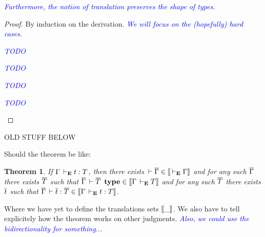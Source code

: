 \documentclass{amsart}
\newcommand\meta[1]{\noindent\textcolor{blue}{\emph{#1}}}
\newtheorem{theorem}{Theorem}[section]
\begin{document}
\meta{Furthermore, the notion of \emph{translation} preserves the shape of
types.}

\begin{proof}
  By induction on the derivation.
  \meta{We will focus on the (hopefully) hard cases.}
  \begin{caselist}
    \nextcase
    \begin{mathc}
    \end{mathc}
    \meta{TODO}

    \nextcase
    \begin{mathc}
    \end{mathc}
    \meta{TODO}

    \nextcase
    \begin{mathc}
    \end{mathc}
    \meta{TODO}

    \nextcase
    \begin{mathc}
    \end{mathc}
    \meta{TODO}
  \end{caselist}
\end{proof}

\newpage
\hrulefill
OLD STUFF BELOW

Should the theorem be like:

\begin{theorem}
  If $\Gamma \,\vdash_\mathbf{E} t : T$, then there exists
  $\,\vdash \overline{\Gamma} \in \mathopen{{[\kern-0.14em[}} \,\vdash_\mathbf{E} \Gamma \mathclose{{]\kern-0.14em]}}$ and for any such $\overline{\Gamma}$ there exists
  $\overline{T}$ such that $\overline{\Gamma} \,\vdash \overline{T}\ \operatorname{\mathbf{type}} \in \mathopen{{[\kern-0.14em[}} \Gamma \,\vdash_\mathbf{E} T \mathclose{{]\kern-0.14em]}}$
  and for any such $\overline{T}$ there exists $\overline{t}$ such that
  $\overline{\Gamma} \,\vdash \overline{t} : \overline{T} \in \mathopen{{[\kern-0.14em[}} \Gamma \,\vdash_\mathbf{E} t : T \mathclose{{]\kern-0.14em]}}$.
\end{theorem}
%
Where we have yet to define the translations sets $\mathopen{{[\kern-0.14em[}} \_ \mathclose{{]\kern-0.14em]}}$.
We also have to tell explicitely how the theorem works on other judgments.
\meta{Also, we could use the bidirectionality for something...}
\end{document}
